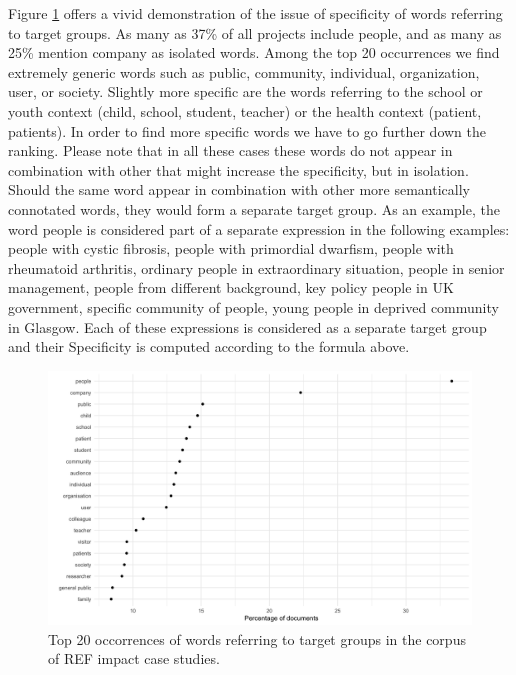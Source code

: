 \documentclass[]{book}
\theoremstyle{definition}
\theoremstyle{definition}
\theoremstyle{definition}
\theoremstyle{remark}
\begin{document}
Figure \ref{fig:impactusersdistributions} offers a vivid demonstration
of the issue of specificity of words referring to target groups. As many
as 37\% of all projects include people, and as many as 25\% mention
company as isolated words. Among the top 20 occurrences we find
extremely generic words such as public, community, individual,
organization, user, or society. Slightly more specific are the words
referring to the school or youth context (child, school, student,
teacher) or the health context (patient, patients). In order to find
more specific words we have to go further down the ranking. Please note
that in all these cases these words do not appear in combination with
other that might increase the specificity, but in isolation. Should the
same word appear in combination with other more semantically connotated
words, they would form a separate target group. As an example, the word
people is considered part of a separate expression in the following
examples: people with cystic fibrosis, people with primordial dwarfism,
people with rheumatoid arthritis, ordinary people in extraordinary
situation, people in senior management, people from different
background, key policy people in UK government, specific community of
people, young people in deprived community in Glasgow. Each of these
expressions is considered as a separate target group and their
Specificity is computed according to the formula above.

\begin{figure}

{\centering \includegraphics[width=1\linewidth]{_bookdown_files/figures/impact_users_distributions} 

}

\caption{Top 20 occorrences of words referring to target groups in the corpus of REF impact case studies.}\label{fig:impactusersdistributions}
\end{figure}
\end{document}
